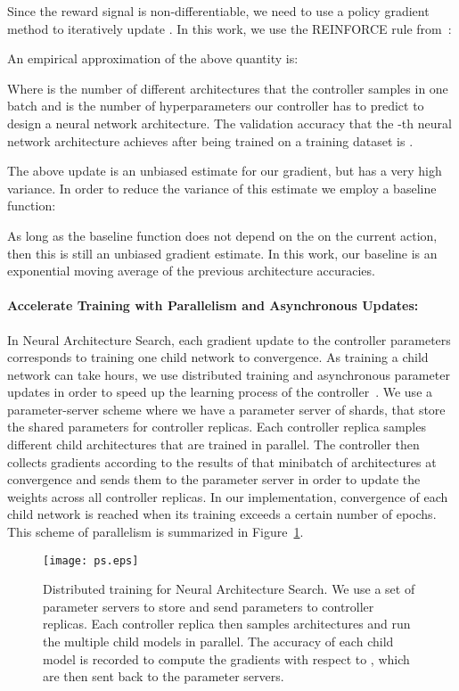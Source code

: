 \documentclass{article} \usepackage{iclr2017_conference,times}
\begin{document}
Since the reward signal  is non-differentiable, we need to use a policy gradient method to iteratively update . In this work, we use the REINFORCE rule from~\cite{Williams92simplestatistical}: 


An empirical approximation of the above quantity is:


Where  is the number of different architectures that the controller samples in one batch and  is the number of hyperparameters our controller has to predict to design a neural network architecture. The validation accuracy that the -th neural network architecture achieves after being trained on a training dataset is .

The above update is an unbiased estimate for our gradient, but has a very high variance. In order to reduce the variance of this estimate we employ a baseline function:



As long as the baseline function  does not depend on the on the current action, then this is still an unbiased gradient estimate. In this work, our baseline  is an exponential moving average of the previous architecture accuracies.








\paragraph{Accelerate Training with Parallelism and Asynchronous Updates:} In Neural Architecture Search, each gradient update to the controller parameters  corresponds to training one child network to convergence. As training a child network can take hours, we use distributed training and asynchronous parameter updates in order to speed up the learning process of the controller~\citep{dean2012large}. We use a parameter-server scheme where we have a parameter server of  shards, that store the shared parameters for  controller replicas. Each controller replica samples  different child architectures that are trained in parallel. The controller then collects gradients according to the results of that minibatch of  architectures at convergence and sends them to the parameter server in order to update the weights across all controller replicas. In our implementation, convergence of each child network is reached when its training exceeds a certain number of epochs. This scheme of parallelism is summarized in Figure~\ref{figure:Dist_Setup}.

 \begin{figure}[h!]
\begin{center}
\centerline{\texttt{[image: ps.eps]}}
\caption{Distributed training for Neural Architecture Search. We use a set of  parameter servers to store and send parameters to  controller replicas. Each controller replica then samples  architectures and run the multiple child models in parallel. The accuracy of each child model is recorded to compute the gradients with respect to , which are then sent back to the parameter servers.}
\label{figure:Dist_Setup}
\end{center}
\end{figure}
\end{document}
